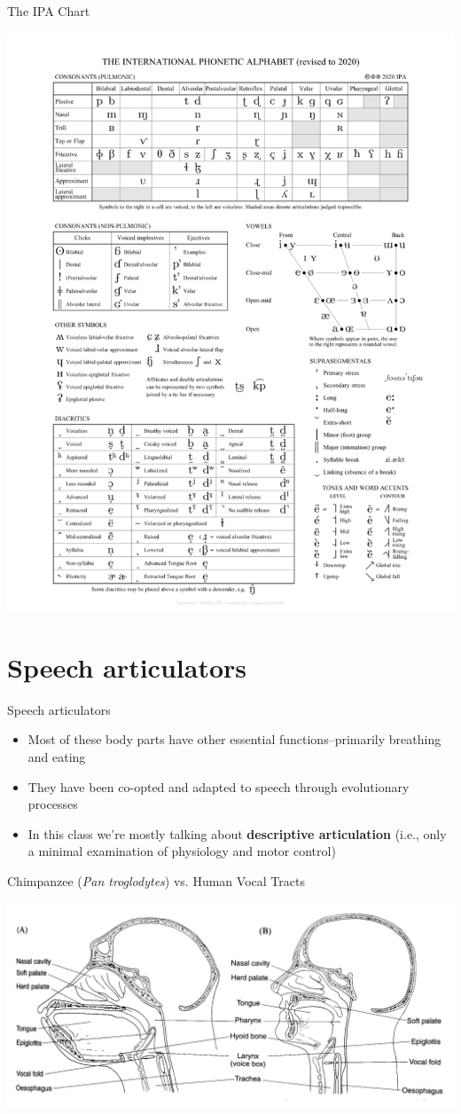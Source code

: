 \documentclass[professionalfonts]{beamer}
\begin{document}
\begin{frame}{The IPA Chart}
    \begin{center}
        \includegraphics[width = .5\textwidth]{figs/IPAChart.png}
    \end{center}
\end{frame}

\section{Speech articulators}
\begin{frame}{Speech articulators}
    \begin{itemize}
        \item Most of these body parts have other essential functions--primarily breathing and eating
        \item They have been co-opted and adapted to speech through evolutionary processes
        \item In this class we're mostly talking about \textbf{descriptive articulation} (i.e., only a minimal examination of physiology and motor control)
    \end{itemize}
\end{frame}

\begin{frame}{Chimpanzee (\textit{Pan troglodytes}) vs. Human Vocal Tracts}
    \begin{center}
        \includegraphics[width = \textwidth]{figs/ChimpanzeeVSHumanVT.png}
    \end{center}
\end{frame}
\end{document}
